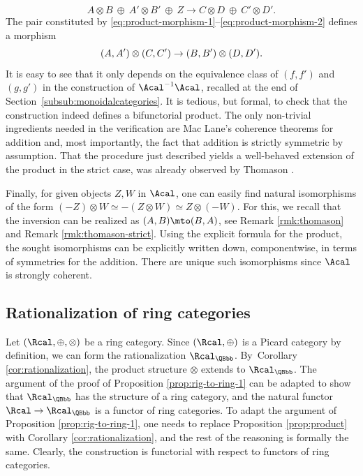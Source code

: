 \begin{equation}\label{eq:product-morphism-2}
A\otimes B\ \oplus\ A'\otimes B'\ \oplus\ Z\to C\otimes D\ \oplus\ C'\otimes D'.
\end{equation}
The pair constituted by \eqref{eq:product-morphism-1}--\eqref{eq:product-morphism-2} defines a morphism\vspace*{-3pt}
\[
(A,A')\otimes (C,C')\to (B,B')\otimes\nobreak (D,D').
\]
It is easy to see that it only depends on the equivalence class of $(f,f')$ and $(g,g')$ in the construction of $\Acal^{-1}\Acal$, recalled at the end of Section~\ref{subsub:monoidalcategories}. It is tedious, but formal, to check that the construction indeed defines a bifunctorial product. The only non-trivial ingredients needed in the verification are Mac Lane's coherence theorems for addition and, most importantly, the fact that addition is strictly symmetric by assumption. That the procedure just described yields a well-behaved extension of the product in the strict case, was already observed by Thomason \cite[p.\,572]{ThomasonPhony}.

Finally, for given objects $Z, W$ in $\Acal$, one can easily find natural isomorphisms of the form $(-Z)\otimes W\simeq -(Z\otimes W)\simeq Z\otimes (-W)$. For this, we recall that the inversion can be realized as $(A,B)\mto (B,A)$, see Remark \ref{rmk:thomason} and Remark \ref{rmk:thomason-strict}. Using the explicit formula for the product, the sought isomorphisms can be explicitly written down, componentwise, in terms of symmetries for the addition. There are unique such isomorphisms since $\Acal$ is strongly coherent.\enlargethispage{.5\baselineskip}%

\subsection{Rationalization of ring categories}\label{subsec:rationalization-ring-categories}
Let $(\Rcal,\oplus,\otimes)$ be a ring category. Since $(\Rcal,\oplus)$ is a Picard category by definition, we can form the rationalization $\Rcal_{\QBbb}$. By~Corollary \ref{cor:rationalization}, the product structure $\otimes$ extends to $\Rcal_{\QBbb}$. The argument of the proof of Proposition \ref{prop:rig-to-ring-1} can be adapted to show that $\Rcal_{\QBbb}$ has the structure of a ring category, and the natural functor $\Rcal\to\Rcal_{\QBbb}$ is a functor of ring categories. To adapt the argument of Proposition \ref{prop:rig-to-ring-1}, one needs to replace Proposition \ref{prop:product} with Corollary \ref{cor:rationalization}, and the rest of the reasoning is formally the same. Clearly, the construction is functorial with respect to functors of ring categories.

